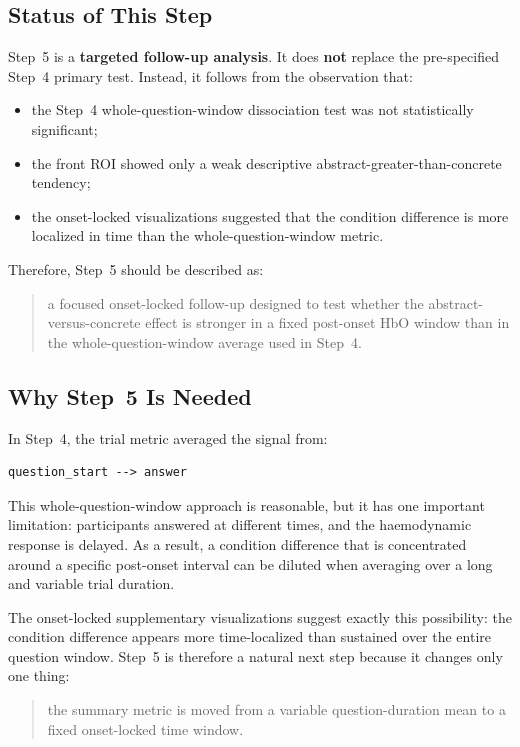 \subsection{Status of This Step}
Step~5 is a \textbf{targeted follow-up analysis}.
It does \textbf{not} replace the pre-specified Step~4 primary test.
Instead, it follows from the observation that:
\begin{itemize}
    \item the Step~4 whole-question-window dissociation test was not statistically significant;
    \item the front ROI showed only a weak descriptive abstract-greater-than-concrete tendency;
    \item the onset-locked visualizations suggested that the condition difference is more localized
    in time than the whole-question-window metric.
\end{itemize}

Therefore, Step~5 should be described as:
\begin{quote}
a focused onset-locked follow-up designed to test whether the abstract-versus-concrete effect is
stronger in a fixed post-onset HbO window than in the whole-question-window average used in Step~4.
\end{quote}

\subsection{Why Step~5 Is Needed}
In Step~4, the trial metric averaged the signal from:
\begin{verbatim}
question_start --> answer
\end{verbatim}

This whole-question-window approach is reasonable, but it has one important limitation:
participants answered at different times, and the haemodynamic response is delayed.
As a result, a condition difference that is concentrated around a specific post-onset interval can be
diluted when averaging over a long and variable trial duration.

The onset-locked supplementary visualizations suggest exactly this possibility:
the condition difference appears more time-localized than sustained over the entire question window.
Step~5 is therefore a natural next step because it changes only one thing:
\begin{quote}
the summary metric is moved from a variable question-duration mean to a fixed onset-locked time window.
\end{quote}

